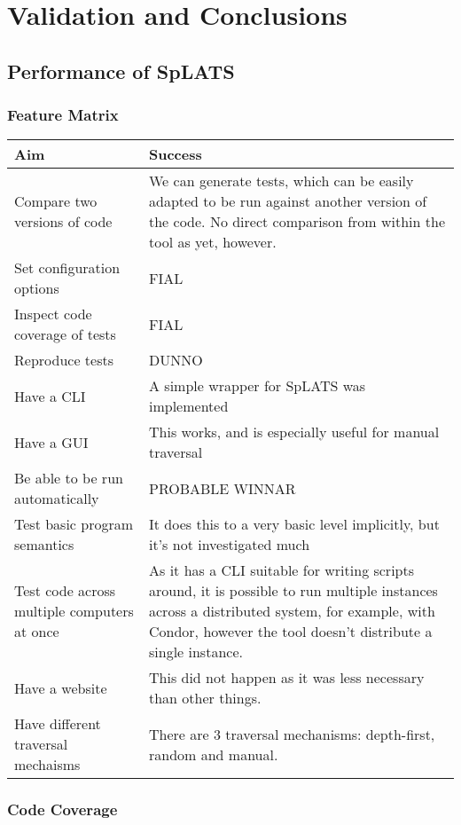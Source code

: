 \chapter{Validation and Conclusions}
\section{Performance of SpLATS}
  \subsection{Feature Matrix}
    \begin{tabular}{p{} | p{}}
    Aim & Success \\
    \hline
    Compare two versions of code &
    We can generate tests, which can be easily adapted to be run against another version of the code.
    No direct comparison from within the tool as yet, however. \\
    Set configuration options & FIAL \\
    Inspect code coverage of tests & FIAL \\
    Reproduce tests & DUNNO \\
    Have a CLI &
    A simple wrapper for SpLATS was implemented \\
    \hline
    Have a GUI &
    This works, and is especially useful for manual traversal \\
    Be able to be run automatically & PROBABLE WINNAR \\
    Test basic program semantics &
    It does this to a very basic level implicitly, but it's not investigated much \\
    Test code across multiple computers at once &
    As it has a CLI suitable for writing scripts around, it is possible to run multiple instances across a distributed system, for example, with Condor, however the tool doesn't distribute a single instance. \\
    \hline
    Have a website &
    This did not happen as it was less necessary than other things. \\
    Have different traversal mechaisms &
    There are 3 traversal mechanisms: depth-first, random and manual. \\
    \end{tabular}

  \subsection{Code Coverage}

